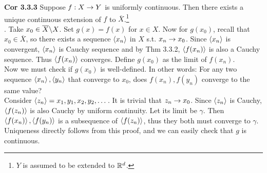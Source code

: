 \textbf{Cor 3.3.3} Suppose $f:X\rightarrow Y$ is uniformly continuous. Then there exists a unique continuous extension of $f$ to $\overline{X}$.\footnote{$Y$ is assumed to be extended to $\mathbb{R}^d$.}\\
\pf. Take $x_0\in \overline{X}\backslash X$. Set $g(x) = f(x)$ for $x\in X$. Now for $g(x_0)$, recall that $x_0\in \overline{X}$, so there exists a sequence $\left\langle x_n \right\rangle$ in $X$ s.t. $x_n\rightarrow x_0$. Since $\left\langle x_n \right\rangle$ is convergent, $\left\langle x_n \right\rangle$ is Cauchy sequence and by Thm 3.3.2, $\left\langle f(x_n) \right\rangle$ is also a Cauchy sequence. Thus $\left\langle f(x_n) \right\rangle$ converges. Define $g(x_0)$ as the limit of $f(x_n)$.\\
Now we must check if $g(x_0)$ is well-defined. In other words: For any two sequence $\left\langle x_n \right\rangle, \left\langle y_n \right\rangle$ that converge to $x_0$, does $f(x_n), f(y_n)$ converge to the same value?\\
Consider $\left\langle z_n \right\rangle = x_1, y_1, x_2, y_2, \dots$. It is trivial that $z_n\rightarrow x_0$. Since $\left\langle z_n \right\rangle$ is Cauchy, $\left\langle f(z_n) \right\rangle$ is also Cauchy by uniform continuity. Let its limit be $\gamma$. Then $\left\langle f(x_n) \right\rangle, \left\langle f(y_n) \right\rangle$ is a subsequence of $\left\langle f(z_n) \right\rangle$, thus they both must converge to $\gamma$. Uniqueness directly follows from this proof, and we can easily check that $g$ is continuous.
\pagebreak